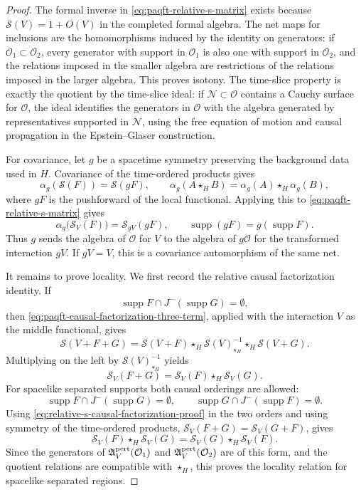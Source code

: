\begin{proof}
The formal inverse in \eqref{eq:paqft-relative-s-matrix} exists because
\(\mathcal S(V)=1+O(V)\) in the completed formal algebra.  The net maps for
inclusions are the homomorphisms induced by the identity on generators: if
\(\mathcal O_1\subset\mathcal O_2\), every generator with support in
\(\mathcal O_1\) is also one with support in \(\mathcal O_2\), and the
relations imposed in the smaller algebra are restrictions of the relations
imposed in the larger algebra.  This proves isotony.  The time-slice property
is exactly the quotient by the time-slice ideal: if
\(\mathcal N\subset\mathcal O\) contains a Cauchy surface for
\(\mathcal O\), the ideal identifies the generators in \(\mathcal O\) with
the algebra generated by representatives supported in \(\mathcal N\), using
the free equation of motion and causal propagation in the Epstein--Glaser
construction.

For covariance, let \(g\) be a spacetime symmetry preserving the background
data used in \(H\).  Covariance of the time-ordered products gives
\[
  \alpha_g(\mathcal S(F))=\mathcal S(gF),
  \qquad
  \alpha_g(A\star_H B)=\alpha_g(A)\star_H\alpha_g(B),
\]
where \(gF\) is the pushforward of the local functional.  Applying this to
\eqref{eq:paqft-relative-s-matrix} gives
\[
  \alpha_g\bigl(\mathcal S_V(F)\bigr)
  =
  \mathcal S_{gV}(gF),
  \qquad
  \operatorname{supp}(gF)=g(\operatorname{supp}F).
\]
Thus \(g\) sends the algebra of \(\mathcal O\) for \(V\) to the algebra of
\(g\mathcal O\) for the transformed interaction \(gV\).  If \(gV=V\), this is
a covariance automorphism of the same net.

It remains to prove locality.  We first record the relative causal
factorization identity.  If
\[
  \operatorname{supp}F\cap J^-(\operatorname{supp}G)=\emptyset ,
\]
then \eqref{eq:paqft-causal-factorization-three-term}, applied with the
interaction \(V\) as the middle functional, gives
\[
  \mathcal S(V+F+G)
  =
  \mathcal S(V+F)\star_H
  \mathcal S(V)^{-1}_{\star_H}\star_H
  \mathcal S(V+G).
\]
Multiplying on the left by \(\mathcal S(V)^{-1}_{\star_H}\) yields
\begin{equation}
  \mathcal S_V(F+G)
  =
  \mathcal S_V(F)\star_H\mathcal S_V(G).
  \label{eq:relative-s-causal-factorization-proof}
\end{equation}
For spacelike separated supports both causal orderings are allowed:
\[
  \operatorname{supp}F\cap J^-(\operatorname{supp}G)=\emptyset,
  \qquad
  \operatorname{supp}G\cap J^-(\operatorname{supp}F)=\emptyset .
\]
Using \eqref{eq:relative-s-causal-factorization-proof} in the two orders and
using symmetry of the time-ordered products,
\(\mathcal S_V(F+G)=\mathcal S_V(G+F)\), gives
\[
  \mathcal S_V(F)\star_H\mathcal S_V(G)
  =
  \mathcal S_V(G)\star_H\mathcal S_V(F).
\]
Since the generators of
\(\mathfrak A_V^{\rm pert}(\mathcal O_1)\) and
\(\mathfrak A_V^{\rm pert}(\mathcal O_2)\) are of this form, and the quotient
relations are compatible with \(\star_H\), this proves the locality relation
for spacelike separated regions.
\end{proof}


